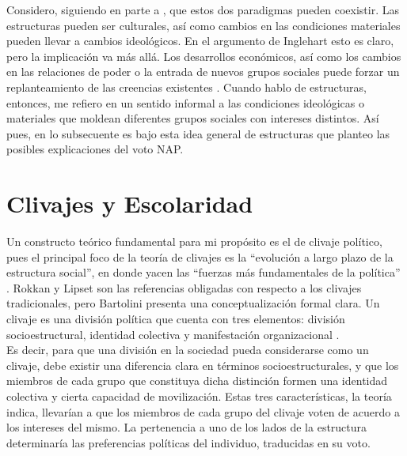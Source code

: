 Considero, siguiendo en parte a \textcite{Sewell92}, que estos dos paradigmas pueden coexistir. Las estructuras pueden ser culturales, así como cambios en las condiciones materiales pueden llevar a cambios ideológicos. En el argumento de Inglehart esto es claro, pero la implicación va más allá. Los desarrollos económicos, así como los cambios en las relaciones de poder o la entrada de nuevos grupos sociales puede forzar un replanteamiento de las creencias existentes \parencite{Berman01}. Cuando hablo de estructuras, entonces, me refiero en un sentido informal a las condiciones ideológicas o materiales que moldean diferentes grupos sociales con intereses distintos. Así pues, en lo subsecuente es bajo esta idea general de estructuras que planteo las posibles explicaciones del voto NAP.\\ 

\section{Clivajes y Escolaridad}

Un constructo teórico fundamental para mi propósito es el de clivaje político, pues el principal foco de la teoría de clivajes es la ``evolución a largo plazo de la estructura social'', en donde yacen las ``fuerzas más fundamentales de la política'' \parencite{Bornschier09}. Rokkan y Lipset son las referencias obligadas con respecto a los clivajes tradicionales, pero Bartolini presenta una conceptualización formal clara. Un clivaje es una división política que cuenta con tres elementos: división socioestructural, identidad colectiva y manifestación organizacional \parencite{Bornschier09}.\\

Es decir, para que una división en la sociedad pueda considerarse como un clivaje, debe existir una diferencia clara en términos socioestructurales, y que los miembros de cada grupo que constituya dicha distinción formen una identidad colectiva y cierta capacidad de movilización. Estas tres características, la teoría indica, llevarían a que los miembros de cada grupo del clivaje voten de acuerdo a los intereses del mismo. La pertenencia a uno de los lados de la estructura determinaría las preferencias políticas del individuo, traducidas en su voto.\\

